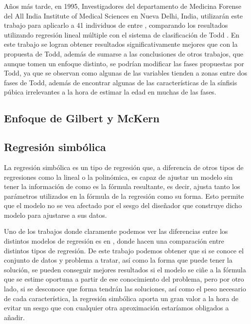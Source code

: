 Años más tarde, en 1995, Investigadores del departamento de Medicina Forense del All India Institute of Medical Sciences en Nueva Delhi, India, utilizarán este trabajo para aplicarlo a 41 individuos de entre , comparando los resultados utilizando regresión lineal múltiple con el sistema de clasificación de Todd \cite{estudioComparandoGilbertTodd}. En este trabajo se logran obtener resultados significativamente mejores que con la propuesta de Todd, además de sumarse a las conclusiones de otros trabajos, que aunque tomen un enfoque distinto, se podrían modificar las fases propuestas por Todd, ya que se observan como algunas de las variables tienden a zonas entre dos fases de Todd, además de encontrar algunas de las características de la sínfisis púbica irrelevantes a la hora de estimar la edad en muchas de las fases.


\subsection{Enfoque de Gilbert y McKern}




\subsection{Regresión simbólica}

La regresión simbólica es un tipo de regresión que, a diferencia de otros tipos de regresiones como la lineal o la polinómica, es capaz de ajustar un modelo sin tener la información de como es la fórmula resultante, es decir, ajusta tanto los parámetros utilizados en la fórmula de la regresión como su forma. Esto permite que el modelo no se vea afectado por el sesgo del diseñador que construye dicho modelo para ajustarse a sus datos.

Uno de los trabajos donde claramente podemos ver las diferencias entre los distintos modelos de regresión es en \cite{analisisRegresionSimbolica}, donde hacen una comparación entre distintos tipos de regresión. De este trabajo podemos obtener que si se conoce el conjunto de datos y problema a tratar, así como la forma que puede tener la solución, se pueden conseguir mejores resultados si el modelo se ciñe a la fórmula que se estime oportuna a partir de ese conocimiento del problema, pero por otro lado, si se desconoce que forma tendrán las soluciones, así como el peso necesario de cada característica, la regresión simbólica aporta un gran valor a la hora de evitar un sesgo que con cualquier otra aproximación estaríamos obligados a añadir.

